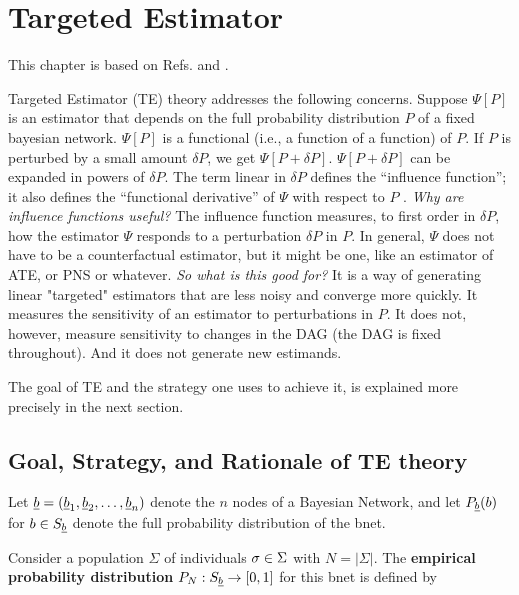\chapter{Targeted Estimator}
\label{ch-targeted-est}

\newcommand{\dpsi}[0]{\nabla\Psi}
\newcommand{\hatl}[0]{\HAT{\call}}

This chapter is based on Refs.\cite{tlride} and  \cite{hoff}.

Targeted Estimator (TE) theory  addresses
the following concerns.
Suppose $\Psi[P]$ is an estimator that depends on the full probability distribution $P$ of a fixed bayesian network.
$\Psi[P]$ is a functional (i.e., a function of a function) of $P$. If $P$ is perturbed by a small amount $\delta P$, we get $\Psi[P+\delta P]$. $\Psi[P + \delta P]$ can be expanded in powers of $\delta P$.
The term linear  in $\delta P$ defines the \enquote{influence function}; it
also defines the \enquote{functional derivative}  of $\Psi$ with respect to $P$
. {\it Why are influence functions useful?}
 The influence function measures,
 to first order in $\delta P$, how the estimator $\Psi$ responds to a perturbation 
 $\delta P$ in $P$. In general, $\Psi$ does not have to be a counterfactual estimator, but it might be one, like an estimator of ATE, or PNS or whatever.
{\it So what is this good for?} It is a way of generating linear "targeted" estimators
that are less noisy
and converge more quickly. It measures the sensitivity of an estimator to perturbations in $P$. It does not, however, measure sensitivity to changes in the DAG (the DAG is fixed throughout). And it does not generate new estimands.

The goal of TE and
the strategy one uses to achieve it, is
explained more precisely in the next section.




\section{Goal, Strategy, and Rationale of TE theory}


Let ${\underline{b}} = ({\underline{b}}_1, {\underline{b}}_2, \ldots, {\underline{b}}_{n})$ denote
the $n$ nodes of a Bayesian Network, and let $P_{\underline{b}}(b)$ for $b\in S_{\underline{b}}$
denote the full probability distribution of the bnet.

 Consider a population $\Sigma$ of
 individuals $\sigma\in \Sigma$ with $N=|\Sigma|$.
 The {\bf empirical probability distribution}
 $P_N:S_{\underline{b}} \rightarrow [0,1]$ for this bnet is defined by

